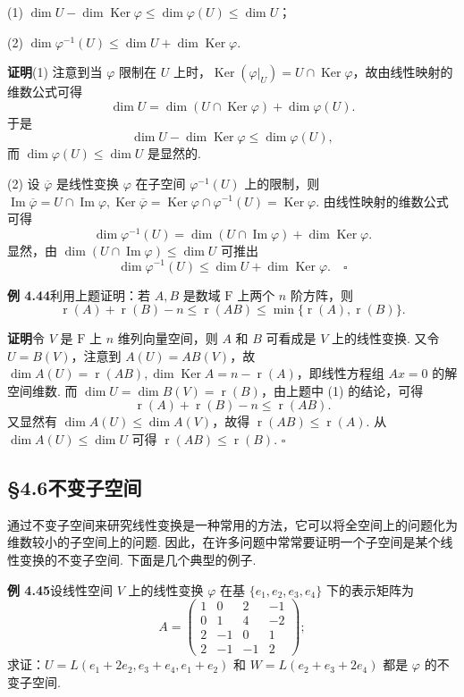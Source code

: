 \documentclass[UTF8, 12pt, fontset=fandol, oneside]{ctexart}
\begin{document}
(1) $\dim U-\dim\operatorname{Ker}\varphi\le\dim\varphi(U)\le\dim U$；

(2) $\dim\varphi^{-1}(U)\le\dim U+\dim\operatorname{Ker}\varphi$.

\noindent\textbf{证明}\quad (1) 注意到当 $\varphi$ 限制在 $U$ 上时，$\operatorname{Ker}(\varphi|_U)=U\cap\operatorname{Ker}\varphi$，故由线性映射的维数公式可得
\[
\dim U=\dim(U\cap\operatorname{Ker}\varphi)+\dim\varphi(U).
\]
于是
\[
\dim U-\dim\operatorname{Ker}\varphi\le\dim\varphi(U),
\]
而 $\dim\varphi(U)\le\dim U$ 是显然的.

(2) 设 $\overline{\varphi}$ 是线性变换 $\varphi$ 在子空间 $\varphi^{-1}(U)$ 上的限制，则 $\operatorname{Im}\overline{\varphi}=U\cap\operatorname{Im}\varphi,\operatorname{Ker}\overline{\varphi}=\operatorname{Ker}\varphi\cap\varphi^{-1}(U)=\operatorname{Ker}\varphi$. 由线性映射的维数公式可得
\[
\dim\varphi^{-1}(U)=\dim(U\cap\operatorname{Im}\varphi)+\dim\operatorname{Ker}\varphi.
\]
显然，由 $\dim(U\cap\operatorname{Im}\varphi)\le\dim U$ 可推出
\[
\dim\varphi^{-1}(U)\le\dim U+\dim\operatorname{Ker}\varphi. \quad \square
\]

\noindent\textbf{例 4.44}\quad 利用上题证明：若 $A,B$ 是数域 $\mathrm{F}$ 上两个 $n$ 阶方阵，则
\[
\operatorname{r}(A)+\operatorname{r}(B)-n\le\operatorname{r}(AB)\le \min\{\operatorname{r}(A),\operatorname{r}(B)\}.
\]

\noindent\textbf{证明}\quad 令 $V$ 是 $\mathrm{F}$ 上 $n$ 维列向量空间，则 $A$ 和 $B$ 可看成是 $V$ 上的线性变换. 又令 $U=B(V)$，注意到 $A(U)=AB(V)$，故 $\dim A(U)=\operatorname{r}(AB),\dim\operatorname{Ker}A=n-\operatorname{r}(A)$，即线性方程组 $Ax=0$ 的解空间维数. 而 $\dim U=\dim B(V)=\operatorname{r}(B)$，由上题中 (1) 的结论，可得
\[
\operatorname{r}(A)+\operatorname{r}(B)-n\le\operatorname{r}(AB).
\]
又显然有 $\dim A(U)\le\dim A(V)$，故得 $\operatorname{r}(AB)\le\operatorname{r}(A)$. 从 $\dim A(U)\le\dim U$ 可得 $\operatorname{r}(AB)\le\operatorname{r}(B)$. $\square$

\subsection*{§4.6\quad 不变子空间}

通过不变子空间来研究线性变换是一种常用的方法，它可以将全空间上的问题化为维数较小的子空间上的问题. 因此，在许多问题中常常要证明一个子空间是某个线性变换的不变子空间. 下面是几个典型的例子.

\noindent\textbf{例 4.45}\quad 设线性空间 $V$ 上的线性变换 $\varphi$ 在基 $\{e_1,e_2,e_3,e_4\}$ 下的表示矩阵为
\[
A=\left(\begin{array}{rrrr}
1 & 0 & 2 & -1\\
0 & 1 & 4 & -2\\
2 & -1 & 0 & 1\\
2 & -1 & -1 & 2
\end{array}\right);
\]
求证：$U=L(e_1+2e_2,e_3+e_4,e_1+e_2)$ 和 $W=L(e_2+e_3+2e_4)$ 都是 $\varphi$ 的不变子空间.
\end{document}
